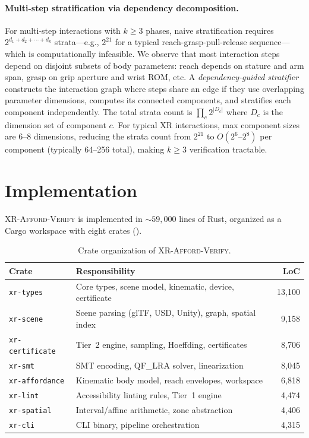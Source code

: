 \documentclass[11pt,letterpaper]{article}
\newcommand{\tool}{\textsc{XR-Afford-Verify}}
\begin{document}
\paragraph{Multi-step stratification via dependency decomposition.}
For multi-step interactions with $k \geq 3$ phases, naive stratification requires $2^{d_1 + d_2 + \cdots + d_k}$ strata---e.g., $2^{21}$ for a typical reach-grasp-pull-release sequence---which is computationally infeasible.
We observe that most interaction steps depend on disjoint subsets of body parameters: reach depends on stature and arm span, grasp on grip aperture and wrist ROM, etc.
A \emph{dependency-guided stratifier} constructs the interaction graph where steps share an edge if they use overlapping parameter dimensions, computes its connected components, and stratifies each component independently.
The total strata count is $\prod_c 2^{|D_c|}$ where $D_c$ is the dimension set of component $c$.
For typical XR interactions, max component sizes are 6--8 dimensions, reducing the strata count from $2^{21}$ to $O(2^6\text{--}2^8)$ per component (typically 64--256 total), making $k \geq 3$ verification tractable.

\section{Implementation}
\label{sec:impl}

\tool{} is implemented in ${\sim}59{,}000$ lines of Rust, organized as a Cargo workspace with eight crates ().

\begin{table}[t]
\centering
\caption{Crate organization of \tool{}.}
\label{tab:crates}
\small
\begin{tabular}{@{}llr@{}}
\toprule
\textbf{Crate} & \textbf{Responsibility} & \textbf{LoC} \\
\midrule
\texttt{xr-types}       & Core types, scene model, kinematic, device, certificate & 13{,}100 \\
\texttt{xr-scene}       & Scene parsing (glTF, USD, Unity), graph, spatial index & 9{,}158 \\
\texttt{xr-certificate} & Tier~2 engine, sampling, Hoeffding, certificates & 8{,}706 \\
\texttt{xr-smt}          & SMT encoding, QF\_LRA solver, linearization & 8{,}045 \\
\texttt{xr-affordance}  & Kinematic body model, reach envelopes, workspace & 6{,}818 \\
\texttt{xr-lint}         & Accessibility linting rules, Tier~1 engine & 4{,}474 \\
\texttt{xr-spatial}     & Interval/affine arithmetic, zone abstraction & 4{,}406 \\
\texttt{xr-cli}          & CLI binary, pipeline orchestration & 4{,}315 \\
\bottomrule
\end{tabular}
\end{table}
\end{document}
